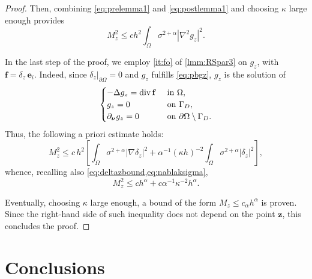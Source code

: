 \documentclass[final,hidelinks]{siamart1116Arxiv}
\numberwithin{theorem}{section}
\newcommand{\Div}{{\rm div}\,}
\newcommand{\normal}{{\boldsymbol \nu}}
\begin{document}
\begin{proof}
 Then, combining \cref{eq:prelemma1} and \cref{eq:postlemma1} and choosing $\kappa$ large enough provides
 \begin{equation}
  M_z^2\leq ch^2\int_\Omega\sigma^{2+\alpha}|\nabla^2g_z|^2.
 \end{equation}

 In the last step of the proof, we employ \ref{it:fo} of \cref{lmm:RSpar3} on $g_z$, with $\mathbf f = \delta_z\,\mathbf e_i$.
 Indeed, since $\delta_z|_{\partial\Omega}=0$ and $g_z$ fulfills \cref{eq:pbgz}, $g_z$ is the solution of
 \begin{equation}\begin{cases}
  -\Delta g_z = \Div \mathbf f & \text{ in }\Omega, \\
  g_z = 0 & \text{ on }\Gamma_D, \\
  \partial_\normal g_z = 0 & \text{ on }\partial\Omega\setminus\Gamma_D.
 \end{cases}\end{equation}
 Thus, the following a priori estimate holds:
 \begin{equation}
  M_z^2 \leq c\,h^2\left[\int_\Omega\sigma^{2+\alpha}|\nabla\delta_z|^2 + \alpha^{-1}(\kappa h)^{-2}\int_\Omega\sigma^{2+\alpha}|\delta_z|^2\right],  
 \end{equation}
 whence, recalling also \cref{eq:deltazbound,eq:nablaksigma},
 \begin{equation}
  M_z^2 \leq ch^\alpha + c\alpha^{-1}\kappa^{-2}h^\alpha.
 \end{equation}

 Eventually, choosing $\kappa$ large enough, a bound of the form $M_z\leq c_\alpha h^\alpha$ is proven.
 Since the right-hand side of such inequality does not depend on the point $\mathbf z$, this concludes the proof.
\end{proof}

\section{Conclusions}
\label{sec:conclusioni}
\end{document}
